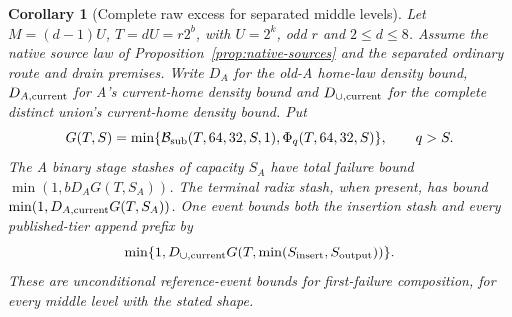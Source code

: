\documentclass[11pt]{article}
\newtheorem{corollary}[theorem]{Corollary}
\theoremstyle{definition}
\theoremstyle{remark}
\begin{document}
\begin{corollary}[Complete raw excess for separated middle levels]
\label{cor:middle-storage}
Let $M=(d-1)U$, $T=dU=r2^b$, with $U=2^k$, odd $r$ and
$2\le d\le8$. Assume the native source law of
Proposition~\ref{prop:native-sources} and the separated ordinary route
and drain premises. Write $D_A$ for the old-A home-law density bound,
$D_{A,\rm current}$ for A's current-home density bound and
$D_{\cup,\rm current}$ for the complete distinct union's current-home
density bound. Put
\[
 G(T,S)=\min\{\mathcal B_{\rm sub}(T,64,32,S,1),
                         \Phi_q(T,64,32,S)\},\qquad q>S.
\]
The A binary stage stashes of capacity $S_A$ have total failure bound
$\min(1,bD_A G(T,S_A))$. The terminal radix stash, when present, has
bound $\min(1,D_{A,\rm current}G(T,S_A))$. One event bounds both the
insertion stash and every published-tier append prefix by
\[
 \min\{1,D_{\cup,\rm current}
       G(T,\min(S_{\rm insert},S_{\rm output}))\}.
\]
These are unconditional reference-event bounds for first-failure
composition, for every middle level with the stated shape.
\end{corollary}
\end{document}
